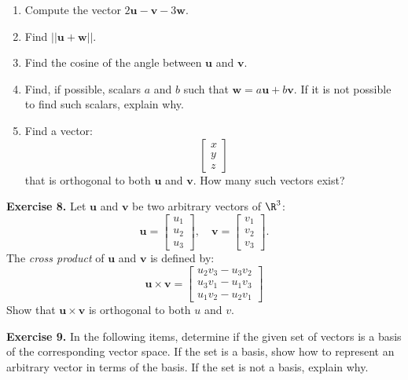 \documentclass[12pt]{article}
\begin{document}
\begin{enumerate} 

\item Compute the vector $2\mathbf{u}-\mathbf{v}-3\mathbf{w}$.

\item Find $||\mathbf{u}+\mathbf{w}||$.

\item Find the cosine of the angle between $\mathbf{u}$ and $\mathbf{v}$.

\item Find, if possible, scalars $a$ and $b$ such that $\mathbf{w}=a\mathbf{u}+b\mathbf{v}$. If it is not possible to find such scalars, explain why.

\item Find a vector:
\[
\begin{bmatrix}x\\y\\z\end{bmatrix}
\]
that is orthogonal to both $\mathbf{u}$ and $\mathbf{v}$. How many such vectors exist?
\end{enumerate}

\textbf{Exercise 8.} Let $\mathbf{u}$ and $\mathbf{v}$ be two arbitrary vectors of $\R^3$:
\[
\mathbf{u}=\begin{bmatrix} u_1\\u_2\\u_3 \end{bmatrix}, \quad
\mathbf{v}=\begin{bmatrix} v_1\\v_2\\v_3 \end{bmatrix}.
\]
The \emph{cross product} of $\mathbf{u}$ and $\mathbf{v}$ is defined by:
\[
\mathbf{u}\times\mathbf{v} =
\begin{bmatrix}u_2v_3-u_3v_2 \\ u_3v_1-u_1v_3\\ u_1v_2-u_2v_1\end{bmatrix}
\]
Show that $\mathbf{u}\times\mathbf{v}$ is orthogonal to both $u$ and $v$.

\textbf{Exercise 9.} In the following items, determine if the given set of vectors is a basis of the corresponding vector space. If the set is a basis, show how to represent an arbitrary vector in terms of the basis. If the set is not a basis, explain why.
\end{document}
